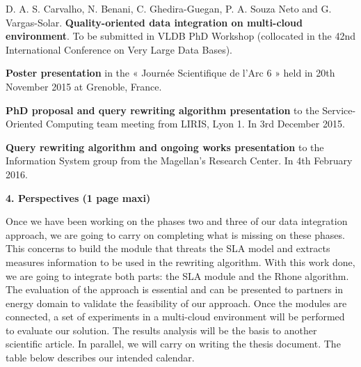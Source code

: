 \documentclass[11pt,a4paper,oneside]{report}
\begin{document}
\noindent
D. A. S. Carvalho, N. Benani, C. Ghedira-Guegan, P. A. Souza Neto and G. Vargas-Solar. \textbf{Quality-oriented data integration on multi-cloud environment}. To be submitted in VLDB PhD Workshop (collocated in the 42nd International Conference on Very Large Data Bases).
\bigskip

\noindent
\textbf{Poster presentation} in the « Journée Scientifique de l'Arc 6 » held in 20th November 2015 at Grenoble, France. 
\bigskip

\noindent
\textbf{PhD proposal and query rewriting algorithm presentation} to the Service-Oriented Computing team meeting from LIRIS, Lyon 1. In 3rd December 2015.
\bigskip

\noindent
\textbf{Query rewriting algorithm and ongoing works presentation} to the Information System group from the Magellan’s Research Center. In 4th February 2016.

\newpage
\begin{flushleft}
\textbf{4. Perspectives (1 page maxi)}\\
\end{flushleft}
Once we have been working on the phases two and three of our data integration approach, we are going to carry on completing what is missing on these phases. This concerns to build the module that threats the SLA model and extracts measures information to be used in the rewriting algorithm. With this work done, we are going to integrate both parts: the SLA module and the Rhone algorithm. 
The evaluation of the approach is essential and can be presented to partners in energy domain to validate the feasibility of our approach. Once the modules are connected, a set of experiments in a multi-cloud environment will be performed to evaluate our solution. The results analysis will be the basis to another scientific article. In parallel, we will carry on writing the thesis document. The table below describes our intended calendar. 
\end{document}
